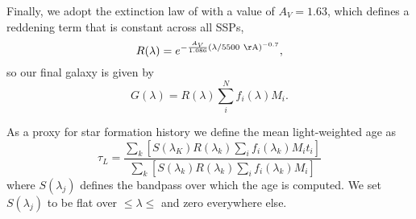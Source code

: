 Finally, we adopt the extinction law of \citet{Charlot00} with a value
of $A_V=1.63$, which defines a reddening term that is constant across all SSPs, 
\begin{equation}
R(\lambda) = e^{-\frac{A_V}{1.086} \left(\lambda/\val{5500}{\AA}\right)^{-0.7}},
\end{equation}
 so our final galaxy is given by
\begin{equation}
G(\lambda) = R(\lambda)\sum_i^N f_i(\lambda) M_i.
\end{equation}

As a proxy for star formation history we define the mean light-weighted age as
\begin{equation}
\label{TM:eq:MLWA}
\tau_L = \frac{\sum_k\left[S(\lambda_K) R(\lambda_k) \sum_i f_i(\lambda_k) M_i t_i\right]}{\sum_{k}\left[S(\lambda_k) R(\lambda_k) \sum_i f_i(\lambda_k) M_i\right]}
\end{equation}
where $S(\lambda_j)$ defines the bandpass over which the age is computed. We
set $S(\lambda_j)$ to be flat over  $\leq\lambda\leq$
 and zero everywhere else.



